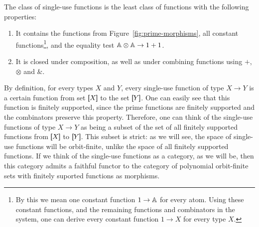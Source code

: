    


\begin{definition} The class of single-use functions is the least class of functions with the following properties:
        \begin{enumerate}
            \item It contains the functions from Figure~\ref{fig:prime-morphisms}, all constant functions\footnote{By this we mean one constant function $1 \to \mathbb A$ for every atom. Using these constant functions, and the remaining functions and combinators in the system, one can derive every constant function $1 \to X$ for every type $X$.}, and the equality test $\mathbb A \otimes \mathbb A \to 1+1$.
            \item It is closed under composition, as well as under combining functions using  $+$, $\otimes$ and $\&$. 
        \end{enumerate}
\end{definition}

By definition, for every types $X$ and $Y$, every single-use function of type $X \to Y$ is a certain function from set $[\!\![X]\!\!]$ to the set $[\!\![Y]\!\!]$. One can easily see that this function is  finitely supported, since the prime functions are finitely supported and the combinators preserve this property.  Therefore, one can think of the single-use functions of type $X \to Y$ as being a subset of the set of all finitely supported functions from $[\!\![X]\!\!]$ to $[\!\![Y]\!\!]$. This subset is strict: as we will see, the space of single-use functions will be orbit-finite, unlike the space of all finitely supported functions. If we think of the single-use functions as a category, as we will be, then this category admits a faithful functor to the category of polynomial orbit-finite sets with finitely suported functions as morphisms.


